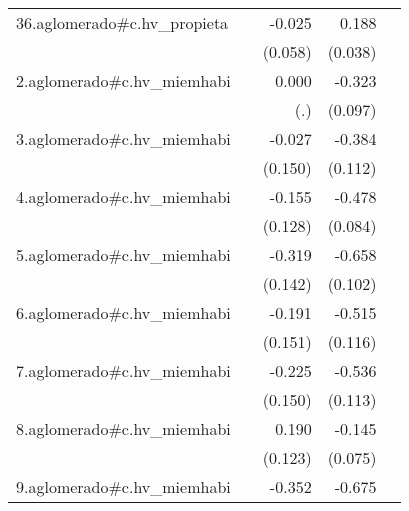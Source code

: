 {\begin{longtable}{l*{4}{D{.}{.}{-1}}}
\addlinespace
36.aglomerado#c.hv\_propieta&                     &      -0.025         &       0.188\sym{***}&                     \\
            &                     &     (0.058)         &     (0.038)         &                     \\
\addlinespace
2.aglomerado#c.hv\_miemhabi&                     &       0.000         &      -0.323\sym{***}&                     \\
            &                     &         (.)         &     (0.097)         &                     \\
\addlinespace
3.aglomerado#c.hv\_miemhabi&                     &      -0.027         &      -0.384\sym{***}&                     \\
            &                     &     (0.150)         &     (0.112)         &                     \\
\addlinespace
4.aglomerado#c.hv\_miemhabi&                     &      -0.155         &      -0.478\sym{***}&                     \\
            &                     &     (0.128)         &     (0.084)         &                     \\
\addlinespace
5.aglomerado#c.hv\_miemhabi&                     &      -0.319\sym{*}  &      -0.658\sym{***}&                     \\
            &                     &     (0.142)         &     (0.102)         &                     \\
\addlinespace
6.aglomerado#c.hv\_miemhabi&                     &      -0.191         &      -0.515\sym{***}&                     \\
            &                     &     (0.151)         &     (0.116)         &                     \\
\addlinespace
7.aglomerado#c.hv\_miemhabi&                     &      -0.225         &      -0.536\sym{***}&                     \\
            &                     &     (0.150)         &     (0.113)         &                     \\
\addlinespace
8.aglomerado#c.hv\_miemhabi&                     &       0.190         &      -0.145         &                     \\
            &                     &     (0.123)         &     (0.075)         &                     \\
\addlinespace
9.aglomerado#c.hv\_miemhabi&                     &      -0.352\sym{*}  &      -0.675\sym{***}&                     \\

\end{longtable}}
